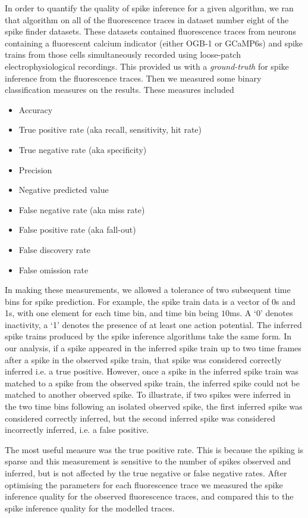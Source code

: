 In order to quantify the quality of spike inference for a given algorithm, we ran that algorithm on all of the fluorescence traces in dataset number eight of the spike finder datasets. These datasets contained fluorescence traces from neurons containing a fluorescent calcium indicator (either OGB-1 or GCaMP6s) and spike trains from those cells simultaneously recorded using loose-patch electrophysiological recordings. This provided us with a \textit{ground-truth} for spike inference from the fluorescence traces. Then we measured some binary classification measures on the results. These measures included
\begin{itemize}
    \item Accuracy
    \item True positive rate (aka recall, sensitivity, hit rate)
    \item True negative rate (aka specificity)
    \item Precision
    \item Negative predicted value
    \item False negative rate (aka miss rate)
    \item False positive rate (aka fall-out)
    \item False discovery rate
    \item False omission rate
\end{itemize}
In making these measurements, we allowed a tolerance of two subsequent time bins for spike prediction. For example, the spike train data is a vector of 0s and 1s, with one element for each time bin, and time bin being $10$ms. A `0' denotes inactivity, a `1' denotes the presence of at least one action potential. The inferred spike trains produced by the spike inference algorithms take the same form. In our analysis, if a spike appeared in the inferred spike train up to two time frames after a spike in the observed spike train, that spike was considered correctly inferred i.e. a true positive. However, once a spike in the inferred spike train was matched to a spike from the observed spike train, the inferred spike could not be matched to another observed spike. To illustrate, if two spikes were inferred in the two time bins following an isolated observed spike, the first inferred spike was considered correctly inferred, but the second inferred spike was considered incorrectly inferred, i.e. a false positive.

The most useful measure was the true positive rate. This is because the spiking is sparse and this measurement is sensitive to the number of spikes observed and inferred, but is not affected by the true negative or false negative rates. After optimising the parameters for each fluorescence trace we measured the spike inference quality for the observed fluorescence traces, and compared this to the spike inference quality for the modelled traces.

